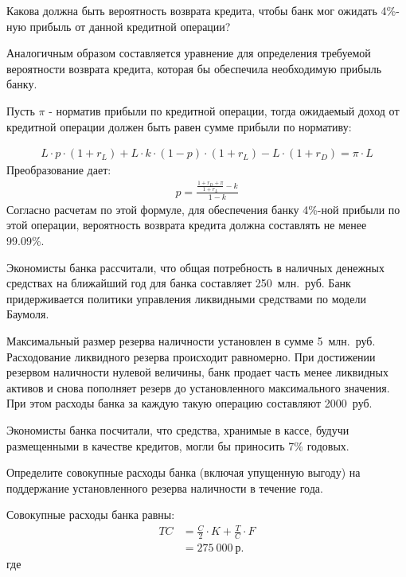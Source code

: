 \documentclass[12pt, table]{exam}
\begin{document}
\begin{questions}
\begin{subparts}
\subpart[10] Какова должна быть вероятность возврата кредита, чтобы банк мог ожидать 4\%-ную прибыль от данной кредитной операции?

\begin{solution}[6em]
Аналогичным образом составляется уравнение для определения требуемой вероятности возврата кредита, которая бы обеспечила необходимую прибыль банку.

Пусть $\pi$ - норматив прибыли по кредитной операции, тогда ожидаемый доход от кредитной операции должен быть равен сумме прибыли по нормативу:

\begin{align*}
L \cdot p \cdot (1+r_L ) + L \cdot k \cdot (1-p) \cdot (1+r_L ) - L \cdot (1+r_D ) = \pi \cdot L
\end{align*}
Преобразование дает:
\begin{align*}
p = \frac{\frac{1+r_D+\pi}{1+r_L} - k}{1 - k}
\end{align*}
Согласно расчетам по этой формуле, для обеспечения банку 4\%-ной прибыли по этой операции, вероятность возврата кредита должна составлять не менее 99.09\%.
\end{solution}

\end{subparts}
\addpoints

\question[20] Экономисты банка рассчитали, что общая потребность в наличных денежных средствах на ближайший год для банка составляет 250~млн.~руб. Банк придерживается политики управления ликвидными средствами по модели Баумоля. 

Максимальный размер резерва наличности установлен в сумме 5~млн.~руб. Расходование ликвидного резерва происходит равномерно. При достижении резервом наличности нулевой величины, банк продает часть менее ликвидных активов и снова пополняет резерв до установленного максимального значения. При этом расходы банка за каждую такую операцию составляют 2000~руб.

Экономисты банка посчитали, что средства,  хранимые в кассе, будучи размещенными в качестве кредитов, могли бы приносить 7\% годовых.
\noaddpoints

\pagebreak
\begin{subparts}
	\subpart[8] Определите совокупные расходы банка (включая упущенную выгоду) на поддержание установленного резерва наличности в течение года.
	
	\begin{solution}[6em]
		
		\raggedright
		Совокупные расходы банка равны:
		\begin{align}
		TC&=\frac{C}{2}\cdot K + \frac{T}{C} \cdot F \\
		&= 275~000~р.\nonumber
		\end{align}	
		где 
		

\end{solution}
\end{subparts}
\end{questions}
\end{document}

